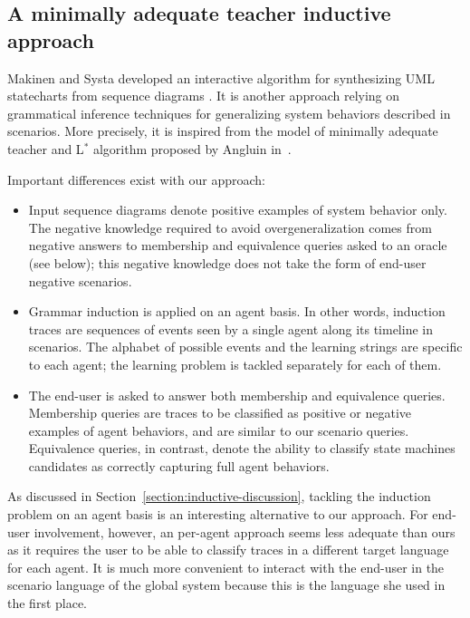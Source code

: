 
\subsection{A minimally adequate teacher inductive approach}

Makinen and Systa developed an interactive algorithm for synthesizing UML statecharts from sequence diagrams \cite{Makinen:2001}. It is another approach relying on grammatical inference techniques for generalizing system behaviors described in scenarios. More precisely, it is inspired from the model of minimally adequate teacher and L$^*$ algorithm proposed by Angluin in~\cite{Angluin:1987}. 

Important differences exist with our approach:
\begin{itemize}

\item Input sequence diagrams denote positive examples of system behavior only. The negative knowledge required to avoid overgeneralization comes from negative answers to membership and equivalence queries asked to an oracle (see below); this negative knowledge does not take the form of end-user negative scenarios.

\item Grammar induction is applied on an agent basis. In other words, induction traces are sequences of events seen by a single agent along its timeline in scenarios. The alphabet of possible events and the learning strings are specific to each agent; the learning problem is tackled separately for each of them.

\item The end-user is asked to answer both membership and equivalence queries. Membership queries are traces to be classified as positive or negative examples of agent behaviors, and are similar to our scenario queries. Equivalence queries, in contrast, denote the ability to classify state machines candidates as correctly capturing full agent behaviors. 
\end{itemize}

As discussed in Section~\ref{section:inductive-discussion}, tackling the induction problem on an agent basis is an interesting alternative to our approach. For end-user involvement, however, an per-agent approach seems less adequate than ours as it requires the user to be able to classify traces in a different target language for each agent. It is much more convenient to interact with the end-user in the scenario language of the global system because this is the language she used in the first place.

